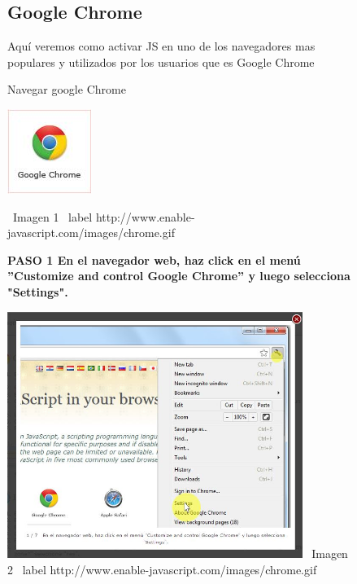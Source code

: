\documentclass[11pt]{article} %
\begin{document}
\begin{figure}
\subsection{Google Chrome}
Aquí veremos como activar JS en uno de los navegadores mas populares y utilizados por los usuarios que es Google Chrome 


\begin{center}
\begin{center}
Navegar google Chrome
\end{center}
\includegraphics[height=3 cm, width=3 cm] {imagenes/chrome.JPG}

\ Imagen 1
\ label { http://www.enable-javascript.com/images/chrome.gif }
\newline
\newline
\begin{center}

\bf PASO 1 
 En el navegador web, haz click en el menú ''Customize and control Google Chrome'' 
y luego selecciona "Settings".
\end{center}

\includegraphics[height=8cm, width=8 cm] {imagenes/chrome 01.JPG}
\newline
\  Imagen 2
\ label { http://www.enable-javascript.com/images/chrome.gif }
\newline

\end{center}
\end{figure}
\end{document}
